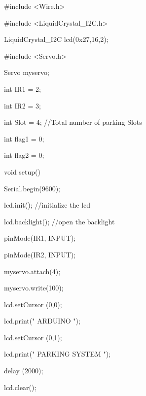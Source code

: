 #include <Wire.h> 

#include <LiquidCrystal_I2C.h>

LiquidCrystal_I2C lcd(0x27,16,2);   

#include <Servo.h> 



Servo myservo;



int IR1 = 2;

int IR2 = 3;



int Slot = 4;           //Total number of parking Slots



int flag1 = 0;

int flag2 = 0;



void setup() {

  Serial.begin(9600); 

    lcd.init(); //initialize the lcd

    lcd.backlight(); //open the backlight

 

 

pinMode(IR1, INPUT);

pinMode(IR2, INPUT);

  

myservo.attach(4);

myservo.write(100);



lcd.setCursor (0,0);

lcd.print("     ARDUINO    ");

lcd.setCursor (0,1);

lcd.print(" PARKING SYSTEM ");

delay (2000);

lcd.clear();  

}



